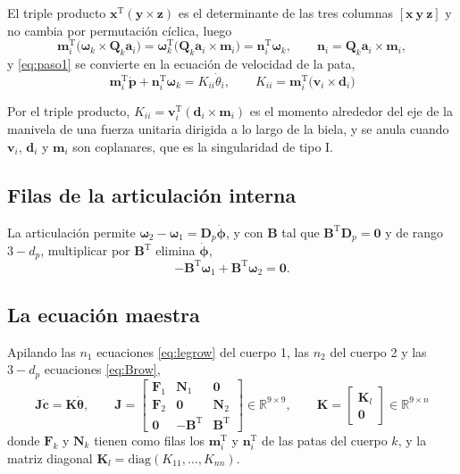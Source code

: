 \documentclass[11pt]{article}
\newcommand{\T}{^{\mathrm{T}}}
\newcommand{\pvec}{\mathbf{p}}
\newcommand{\Fmat}{\mathbf{F}}
\newcommand{\Nmat}{\mathbf{N}}
\newcommand{\wv}{\boldsymbol{\omega}}
\newcommand{\cd}{\dot{\mathbf{c}}}
\newcommand{\thv}{\boldsymbol{\theta}}
\begin{document}
El triple producto $\mathbf{x}\T(\mathbf{y}\times\mathbf{z})$ es el determinante de las tres columnas $[\mathbf{x}\ \mathbf{y}\ \mathbf{z}]$ y no cambia por permutación cíclica, luego
\begin{equation}
\mathbf{m}_i\T\big(\wv_k\times\mathbf{Q}_k\mathbf{a}_i\big)
=\wv_k\T\big(\mathbf{Q}_k\mathbf{a}_i\times\mathbf{m}_i\big)
=\mathbf{n}_i\T\wv_k ,
\qquad
\mathbf{n}_i=\mathbf{Q}_k\mathbf{a}_i\times\mathbf{m}_i ,
\label{eq:triple}
\end{equation}
y \eqref{eq:paso1} se convierte en la ecuación de velocidad de la pata,
\begin{equation}
\boxed{\ \mathbf{m}_i\T\dot{\pvec}+\mathbf{n}_i\T\wv_k=K_{ii}\dot\theta_i ,
\qquad
K_{ii}=\mathbf{m}_i\T\big(\mathbf{v}_i\times\mathbf{d}_i\big)\ }
\label{eq:legrow}
\end{equation}

Por el triple producto, $K_{ii}=\mathbf{v}_i\T(\mathbf{d}_i\times\mathbf{m}_i)$ es el momento alrededor del eje de la manivela de una fuerza unitaria dirigida a lo largo de la biela, y se anula cuando $\mathbf{v}_i$, $\mathbf{d}_i$ y $\mathbf{m}_i$ son coplanares, que es la singularidad de tipo I.

\subsection{Filas de la articulación interna}

La articulación permite $\wv_2-\wv_1=\mathbf{D}_p\dot{\boldsymbol{\phi}}$, y con $\mathbf{B}$ tal que $\mathbf{B}\T\mathbf{D}_p=\mathbf{0}$ y de rango $3-d_p$, multiplicar por $\mathbf{B}\T$ elimina $\dot{\boldsymbol{\phi}}$,
\begin{equation}
-\mathbf{B}\T\wv_1+\mathbf{B}\T\wv_2=\mathbf{0}.
\label{eq:Brow}
\end{equation}

\subsection{La ecuación maestra}

Apilando las $n_1$ ecuaciones \eqref{eq:legrow} del cuerpo 1, las $n_2$ del cuerpo 2 y las $3-d_p$ ecuaciones \eqref{eq:Brow},
\begin{equation}
\boxed{\ \mathbf{J}\cd=\mathbf{K}\dot{\thv},
\qquad
\mathbf{J}=
\begin{bmatrix}
\Fmat_1 & \Nmat_1 & \mathbf{0}\\
\Fmat_2 & \mathbf{0} & \Nmat_2\\
\mathbf{0} & -\mathbf{B}\T & \mathbf{B}\T
\end{bmatrix}\in\mathbb{R}^{9\times9},
\qquad
\mathbf{K}=
\begin{bmatrix}
\mathbf{K}_l\\
\mathbf{0}
\end{bmatrix}\in\mathbb{R}^{9\times n}\ }
\label{eq:maestra}
\end{equation}
donde $\Fmat_k$ y $\Nmat_k$ tienen como filas los $\mathbf{m}_i\T$ y $\mathbf{n}_i\T$ de las patas del cuerpo $k$, y la matriz diagonal $\mathbf{K}_l=\mathrm{diag}(K_{11},\dots,K_{nn})$.
\end{document}
